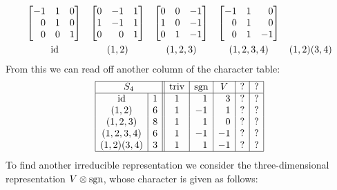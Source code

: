 \begin{example}
\[\begin{array}{ccccc}
\begin{bmatrix*}[r]
          -1  & 1 & 0 \\
           0  & 1 & 0 \\
           0  & 0 & 1
        \end{bmatrix*}
      & \begin{bmatrix*}[r]
          0 & -1  & 1 \\
          1 & -1  & 1 \\
          0 &  0  & 1
        \end{bmatrix*}
      & \begin{bmatrix*}[r]
          0 & 0 & -1  \\
          1 & 0 & -1  \\
          0 & 1 & -1
        \end{bmatrix*}
      & \begin{bmatrix*}[r]
          -1  & 1 &  0  \\
           0  & 1 &  0  \\
           0  & 1 & -1
        \end{bmatrix*}
      \\
        \rule{0pt}{1.2em}
        \id
      & (1,2)
      & (1,2,3)
      & (1,2,3,4)
      & (1,2)(3,4)
    \end{array}
  \]
  From this we can read off another column of the character table:
  \[
    \begin{array}{|c|c||c|c|c|c|c|}
      \hline
        \multicolumn{2}{|c||}{S_4}
      & \triv
      & \sgn
      & V
      & ?
      & ?
      \\
      \hline
        \id
      & 1
      &            1
      & \phantom{-}1
      & \phantom{-}3
      &            ?
      &            ?
      \\
        (1,2)
      & 6
      &            1
      &           -1
      & \phantom{-}1
      &            ?
      &            ?
      \\
        (1,2,3)
      & 8
      &            1
      & \phantom{-}1
      & \phantom{-}0
      &            ?
      &            ?
      \\
        (1,2,3,4)
      & 6
      &            1
      &           -1
      &           -1
      &            ?
      &            ?
      \\
        (1,2)(3,4)
      & 3
      &            1
      & \phantom{-}1
      &           -1
      &            ?
      &            ?
      \\
      \hline
    \end{array}
  \]
  To find another irreducible representation we consider the three-dimensional representation $V \mathbin{\otimes} \operatorname{sgn}$, whose character is given as follows:

\end{example}
